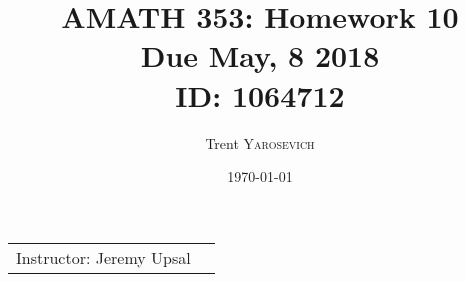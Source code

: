 \documentclass{article}
\title{AMATH 353: Homework 10 \\Due May, 8 2018 \\ ID: 1064712} %
\author{Trent \textsc{Yarosevich}} %
\date{\today} %
\begin{document}
\maketitle %
\setlength\parindent{1cm}

\begin{center}
\begin{tabular}{l r}
Instructor: Jeremy Upsal %
\end{tabular}
\end{center}


\end{document}
